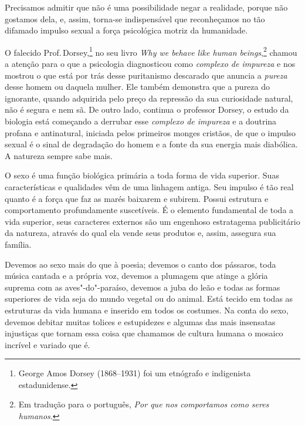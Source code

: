 Precisamos admitir que não é uma possibilidade negar a realidade, porque não gostamos dela, e, assim, torna-se indispensável que
reconheçamos no tão difamado impulso sexual a força psicológica motriz
da humanidade.


O falecido Prof.\,Dorsey,\footnote{George Amos Dorsey (1868--1931) foi um etnógrafo e indigenista estadunidense.} no seu livro \textit{Why we behave like human beings},\footnote{Em tradução para o português, \textit{Por que nos comportamos como seres humanos}.} chamou a atenção para o que a psicologia diagnosticou
como \textit{complexo de impureza} e nos mostrou o que está por trás desse
puritanismo descarado que anuncia a \textit{pureza} desse homem ou daquela mulher. Ele
também demonstra que a pureza do ignorante, quando adquirida pelo preço
da repressão da sua curiosidade natural, não é segura e nem sã. De outro
lado, continua o professor Dorsey, o estudo da biologia está começando a
derrubar esse \textit{complexo de impureza} e a doutrina profana e
antinatural, iniciada pelos primeiros monges cristãos, de que o impulso
sexual é o sinal de degradação do homem e a fonte da sua energia mais
diabólica. A natureza sempre sabe mais.\label{diabolica}

O sexo é uma função biológica primária a toda forma de vida superior.
Suas características e qualidades vêm de uma linhagem antiga. Seu
impulso é tão real quanto é a força que faz as marés baixarem e
subirem. Possui estrutura e comportamento profundamente suscetíveis. É o
elemento fundamental de toda a vida superior, seus caracteres externos
são um engenhoso estratagema publicitário da natureza, através do qual
ela vende seus produtos e, assim, assegura sua família.

Devemos ao sexo mais do que à poesia; devemos o canto dos pássaros, toda
música cantada e a própria voz, devemos a plumagem que atinge a glória
suprema com as aves"-do"-paraíso, devemos a juba do leão e todas as formas
superiores de vida seja do mundo vegetal ou do animal. Está tecido em
todas as estruturas da vida humana e inserido em todos os costumes. Na
conta do sexo, devemos debitar muitas tolices e estupidezes e algumas
das mais insensatas injustiças que tornam essa coisa que chamamos de
cultura humana o mosaico incrível e variado que é.

